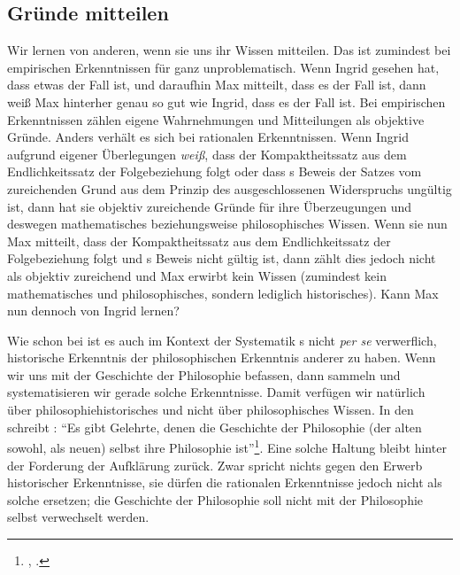 \subsection{Gründe mitteilen}
Wir lernen von anderen, wenn sie uns ihr Wissen mitteilen. Das ist zumindest bei
empirischen Erkenntnissen für  ganz unproblematisch. Wenn
Ingrid gesehen hat, dass etwas der Fall ist, und daraufhin Max mitteilt, dass es
der Fall ist, dann weiß Max hinterher genau so gut wie Ingrid, dass es der Fall
ist. Bei empirischen Erkenntnissen zählen eigene Wahrnehmungen und Mitteilungen
als objektive Gründe. Anders verhält es sich bei rationalen Erkenntnissen. Wenn
Ingrid aufgrund eigener Überlegungen \emph{weiß}, dass der Kompaktheitssatz aus
dem Endlichkeitssatz der Folgebeziehung folgt oder dass
s Beweis der
Satzes vom zureichenden Grund aus dem Prinzip des ausgeschlossenen Widerspruchs
ungültig ist, dann hat sie objektiv zureichende Gründe für ihre Überzeugungen
und deswegen mathematisches beziehungsweise philosophisches Wissen. Wenn sie nun
Max mitteilt, dass der Kompaktheitssatz aus dem Endlichkeitssatz der
Folgebeziehung folgt und
s Beweis
nicht gültig ist, dann zählt dies jedoch nicht als objektiv zureichend und Max
erwirbt kein Wissen (zumindest kein mathematisches und philosophisches,
sondern lediglich historisches). Kann Max nun dennoch von Ingrid lernen?

Wie schon bei  ist es auch im
Kontext der Systematik s nicht \emph{per se} verwerflich, historische
Erkenntnis der philosophischen Erkenntnis anderer zu
haben. Wenn wir uns mit der Geschichte der Philosophie befassen, dann sammeln
und systematisieren wir gerade solche Erkenntnisse. Damit verfügen wir natürlich
über philosophiehistorisches und nicht über philosophisches Wissen. In den
 schreibt : \enquote{Es gibt Gelehrte,
denen die Geschichte der Philosophie (der alten sowohl, als neuen) selbst ihre
Philosophie ist}\footnote{\cite[][A
3]{Kant:ProlegomenazueinerjedenkuenftigenMetaphysikdiealsWissenschaftwirdauftretenkoennen1977},
\cite[][IV: 255.5--6]{Kant:GesammelteWerke1900ff.}.}. Eine solche Haltung bleibt
hinter der Forderung der Aufklärung zurück. Zwar spricht nichts gegen den Erwerb
historischer Erkenntnisse, sie dürfen die rationalen Erkenntnisse jedoch nicht
als solche ersetzen; die Geschichte der Philosophie soll nicht mit der
Philosophie selbst verwechselt werden.

